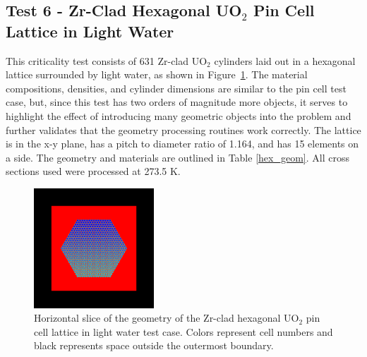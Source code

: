 \documentclass[preprint,12pt]{elsarticle}
\begin{document}
\newpage
\subsection{Test 6 - Zr-Clad Hexagonal UO$_2$ Pin Cell Lattice in Light Water}

This criticality test consists of 631 Zr-clad UO$_2$ cylinders laid out in a hexagonal lattice surrounded by light water, as shown in Figure~\ref{hex_geom_pic}.  The material compositions, densities, and cylinder dimensions are similar to the pin cell test case, but, since this test has two orders of magnitude more objects, it serves to highlight the effect of introducing many geometric objects into the problem and further validates that the geometry processing routines work correctly.  The lattice is in the x-y plane, has a pitch to diameter ratio of 1.164, and has 15 elements on a side.  The geometry and materials are outlined in Table \ref{hex_geom}.  All cross sections used were processed at 273.5 K.

\begin{figure}[h!] 
  \centering
    \includegraphics[width=0.4\textwidth]{graphics/assembly-lw-xy.png}
     \caption{ Horizontal slice of the geometry of the Zr-clad hexagonal UO$_2$ pin cell lattice in light water test case.  Colors represent cell numbers and black represents space outside the outermost boundary. \label{hex_geom_pic} }
\end{figure}
\end{document}

